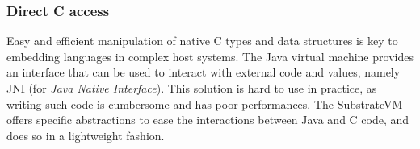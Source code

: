 \documentclass[twoside,11pt,a4paper]{article}
\begin{document}
%
%
%


\subsubsection{Direct C access}

Easy and efficient manipulation of native C types and data structures is key to embedding languages in complex host systems. The Java virtual machine provides an interface that can be used to interact with external code and values, namely JNI (for \textit{Java Native Interface}). This solution is hard to use in practice, as writing such code is cumbersome and has poor performances. The SubstrateVM offers specific abstractions to ease the interactions between Java and C code, and does so in a lightweight fashion.

\end{document}
